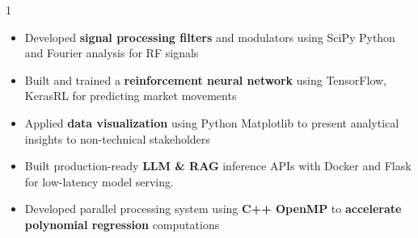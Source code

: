 \documentclass[11pt,a4paper,ragged2e]{altacv}
\begin{document}
\begin{paracol}{1}
\begin{itemize}
\item Developed \textbf{signal processing filters} and modulators using SciPy Python and Fourier analysis for RF signals 
\item Built and trained a \textbf{reinforcement neural network} using TensorFlow, KerasRL for predicting market movements
\item Applied \textbf{data visualization} using Python Matplotlib to present analytical insights to non-technical stakeholders
\item Built production-ready \textbf{LLM \& RAG} inference APIs with Docker and Flask for low-latency model serving.
\item Developed parallel processing system using \textbf{C++ OpenMP} to \textbf{accelerate polynomial regression} computations
\end{itemize}
\tightdivider


\end{paracol}
\end{document}
